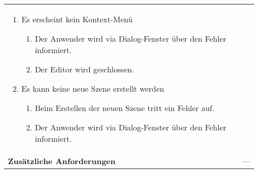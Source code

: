 \begin{longtabu}{p{0.5\textwidth}p{0.5\textwidth}}
\begin{enumerate}
{\begin{enumerate}[label= (\roman*)]
                \end{enumerate}
            }
            \item{Es erscheint kein Kontext-Menü
                \begin{enumerate}[label= (\roman*)]
                    \item{Der Anwender wird via Dialog-Fenster über den Fehler
                            informiert.}
                    \item{Der Editor wird geschlossen.}
                \end{enumerate}
            }
            \item{Es kann keine neue Szene erstellt werden
                \begin{enumerate}[label= (\roman*)]
                    \item{Beim Erstellen der neuen Szene tritt ein Fehler auf.}
                    \item{Der Anwender wird via Dialog-Fenster über den Fehler
                            informiert.}
                \end{enumerate}
            }
        \end{enumerate}\\
    \cmidrule(r){1-1}\cmidrule(lr){2-2}
        \textbf{Zusätzliche Anforderungen} &
        --- \\
    \bottomrule
\end{longtabu}
